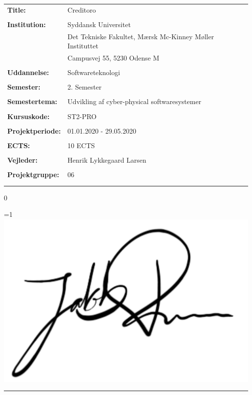 \begin{tabular}{@{}l l} 
\textbf{Title:} & Creditoro \\
& \\
\textbf{Institution:} & Syddansk Universitet \\
& Det Tekniske Fakultet, Mærsk Mc-Kinney Møller Instituttet \\
& Campusvej 55, 5230 Odense M \\
& \\
\textbf{Uddannelse:} & Softwareteknologi \\
& \\
\textbf{Semester:} & 2. Semester \\
& \\
\textbf{Semestertema:} & Udvikling af cyber-physical softwaresystemer \\
& \\
\textbf{Kursuskode:} & ST2-PRO \\
& \\
\textbf{Projektperiode:} &  01.01.2020 - 29.05.2020\\
& \\
\textbf{ECTS:} & 10 ECTS\\
& \\
\textbf{Vejleder:} & Henrik Lykkegaard Larsen\\
& \\
\textbf{Projektgruppe:} & 06\\
& \\

\\
\end{tabular}

\setcounter{PROD} {0}



\ifnum \value{PROD}=1
    \includegraphics[scale=0.07]{figures/signatures/signatureJR.jpg}
    \vspace{-9.5mm}
\fi
\par\rule{\textwidth}{0.4pt}

